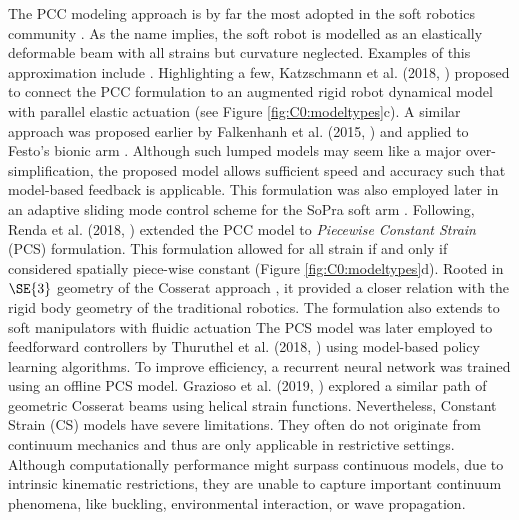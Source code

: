 The PCC modeling approach is by far the most adopted in the soft robotics community \cite{Webster2010}. As the name implies, the soft robot is modelled as an elastically deformable beam with all strains but curvature neglected. Examples of this approximation include \cite{Falkenhahn2015,Marchese2016,Katzschmann2018,Katzschmann2019,Runge2017,Franco2020,Webster2010,DellaSantina2020a}. Highlighting a few, Katzschmann et al. (2018, \cite{Katzschmann2018}) proposed to connect the PCC formulation to an augmented rigid robot dynamical model with parallel elastic actuation (see Figure \ref{fig:C0:modeltypes}c). A similar approach was proposed earlier by Falkenhanh et al. (2015, \cite{Falkenhahn2015}) and applied to Festo's bionic arm \cite{Grzesiak2011}. Although such lumped models may seem like a major over-simplification, the proposed model allows sufficient speed and accuracy such that model-based feedback is applicable. This formulation was also employed later in an adaptive sliding mode control scheme \cite{Kazemipour2022May} for the SoPra soft arm \cite{Toshimitsu2021Sep}. Following, Renda et al. (2018, \cite{Renda2018}) extended the PCC model to \textit{Piecewise Constant Strain} (PCS) formulation. This formulation allowed for all strain if and only if considered spatially piece-wise constant (Figure \ref{fig:C0:modeltypes}d). Rooted in $\SE{3}$ geometry of the Cosserat approach \cite{Simo1986}, it provided a closer relation with the rigid body geometry of the traditional robotics. The formulation also extends to soft manipulators with fluidic actuation \cite{Renda2017Aug, Till2019} The PCS model was later employed to feedforward controllers by Thuruthel et al. (2018, \cite{Thuruthel2018Nov}) using model-based policy learning algorithms. To improve efficiency, a recurrent neural network was trained using an offline PCS model. Grazioso et al. (2019, \cite{Grazioso2019}) explored a similar path of geometric Cosserat beams using helical strain functions. Nevertheless, Constant Strain (CS) models have severe limitations. They often do not originate from continuum mechanics and thus are only applicable in restrictive settings. Although computationally performance might surpass continuous models, due to intrinsic kinematic restrictions, they are unable to capture important continuum phenomena, like buckling, environmental interaction, or wave propagation.

